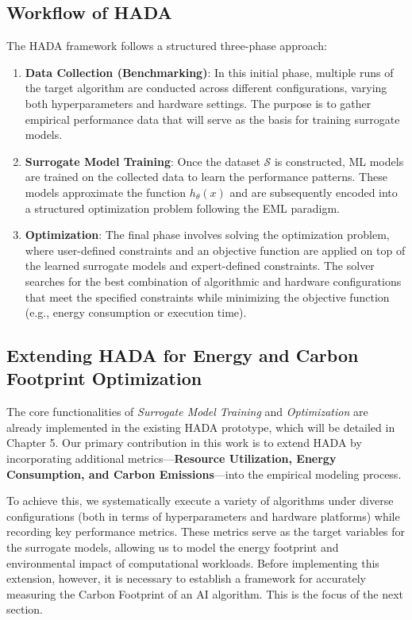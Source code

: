 \documentclass[a4paper,singleside,12pt]{report} %
\begin{document}
\subsection{Workflow of HADA}

The HADA framework follows a structured three-phase approach:

\begin{enumerate}
    \item \textbf{Data Collection (Benchmarking)}: In this initial phase, multiple runs of the target algorithm are conducted across 
    different configurations, varying both hyperparameters and hardware settings. The purpose is to gather empirical performance data 
    that will serve as the basis for training surrogate models.
    \item \textbf{Surrogate Model Training}: Once the dataset $\mathcal{S}$ is constructed, ML models are trained on the collected 
    data to learn the performance patterns. These models approximate the function $h_{\theta}(x)$ and are subsequently encoded into 
    a structured optimization problem following the EML paradigm.
    \item \textbf{Optimization}: The final phase involves solving the optimization problem, where user-defined constraints and an 
    objective function are applied on top of the learned surrogate models and expert-defined constraints. The solver searches for 
    the best combination of algorithmic and hardware configurations that meet the specified constraints while minimizing the 
    objective function (e.g., energy consumption or execution time).
\end{enumerate}


\subsection{Extending HADA for Energy and Carbon Footprint Optimization}

The core functionalities of \textit{Surrogate Model Training} and \textit{Optimization} are already implemented in the existing 
HADA prototype, which will be detailed in Chapter 5. Our primary contribution in this work is to extend HADA by incorporating 
additional metrics—\textbf{Resource Utilization, Energy Consumption, and Carbon Emissions}—into the empirical modeling process.

To achieve this, we systematically execute a variety of algorithms under diverse configurations (both in terms of hyperparameters 
and hardware platforms) while recording key performance metrics. These metrics serve as the target variables for the surrogate 
models, allowing us to model the energy footprint and environmental impact of computational workloads. Before implementing this 
extension, however, it is necessary to establish a framework for accurately measuring the Carbon Footprint of an AI algorithm. 
This is the focus of the next section.
\end{document}
